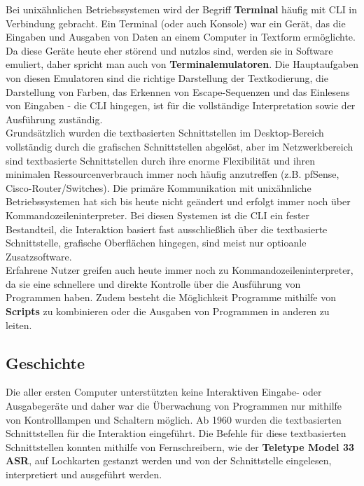 \documentclass[12pt,a4paper]{report}
\begin{document}
\begin{onehalfspace}
Bei unixähnlichen Betriebssystemen wird der Begriff \textbf{Terminal} häufig mit CLI in Verbindung gebracht. Ein Terminal (oder auch Konsole) war ein Gerät, das die Eingaben und Ausgaben von Daten an einem Computer in Textform ermöglichte. Da diese Geräte heute eher störend und nutzlos sind, werden sie in Software emuliert, daher spricht man auch von \textbf{Terminalemulatoren}. Die Hauptaufgaben von diesen Emulatoren sind die richtige Darstellung der Textkodierung, die Darstellung von Farben, das Erkennen von Escape-Sequenzen und das Einlesens von Eingaben - die CLI hingegen, ist für die vollständige Interpretation sowie der Ausführung zuständig. \cite{wiki5}\\

Grundsätzlich wurden die textbasierten Schnittstellen im Desktop-Bereich vollständig durch die grafischen Schnittstellen abgelöst, aber im Netzwerkbereich sind textbasierte Schnittstellen durch ihre enorme Flexibilität und ihren minimalen Ressourcenverbrauch immer noch häufig anzutreffen (z.B. pfSense, Cisco-Router/Switches). Die primäre Kommunikation mit unixähnliche Betriebssystemen hat sich bis heute nicht geändert und erfolgt immer noch über Kommandozeileninterpreter. Bei diesen Systemen ist die CLI ein fester Bestandteil, die Interaktion basiert fast ausschließlich über die textbasierte Schnittstelle, grafische Oberflächen hingegen, sind meist nur optioanle Zusatzsoftware. \cite{wiki6}\\ 

Erfahrene Nutzer greifen auch heute immer noch zu Kommandozeileninterpreter, da sie eine schnellere und direkte Kontrolle über die Ausführung von Programmen haben. Zudem besteht die Möglichkeit Programme mithilfe von \textbf{Scripts} zu kombinieren oder die Ausgaben von Programmen in anderen zu leiten. \cite{wiki07}

\subsection{Geschichte}

Die aller ersten Computer unterstützten keine Interaktiven Eingabe- oder Ausgabegeräte und daher war die Überwachung von Programmen nur mithilfe von Kontrolllampen und Schaltern möglich. Ab 1960 wurden die textbasierten Schnittstellen für die Interaktion eingeführt. Die Befehle für diese textbasierten Schnittstellen konnten mithilfe von Fernschreibern, wie der \textbf{Teletype Model 33 ASR}, auf Lochkarten gestanzt werden und von der Schnittstelle eingelesen, interpretiert und ausgeführt werden. \cite{wiki06} \cite{wiki08} \\


\end{onehalfspace}
\end{document}
